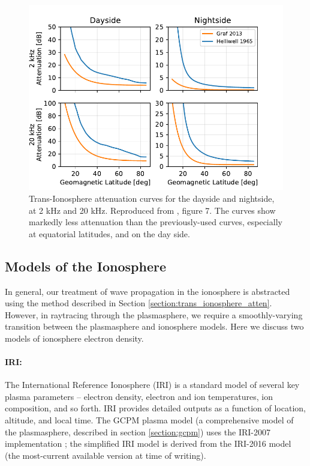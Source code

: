 
\begin{figure}[h]
\begin{center}
\includegraphics{figures/iono_absorp_curves}
\caption[Trans-Ionosphere attenuation curves for day and night]{Trans-Ionosphere attenuation curves for the dayside and nightside, at 2 kHz and 20 kHz. Reproduced from \cite{Graf2013}, figure 7. The \citeauthor{Graf2013} curves show markedly less attenuation than the previously-used \citeauthor{Helliwell1965} curves, especially at equatorial latitudes, and on the day side.}
\label{fig:graf_curves}
\end{center}
\end{figure}


\subsection{Models of the Ionosphere}
In general, our treatment of wave propagation in the ionosphere is abstracted using the method described in Section \ref{section:trans_ionosphere_atten}. However, in raytracing through the plasmasphere, we require a smoothly-varying transition between the plasmasphere and ionosphere models. Here we discuss two models of ionosphere electron density.

\paragraph{IRI:}
The International Reference Ionosphere (IRI) is a standard model of several key plasma parameters -- electron density, electron and ion temperatures, ion composition, and so forth. IRI provides detailed outputs as a function of location, altitude, and local time. The GCPM plasma model (a comprehensive model of the plasmasphere, described in section \ref{section:gcpm}) uses the IRI-2007 implementation \citep{Bilitza2008}; the simplified IRI model is derived from the IRI-2016 model (the most-current available version at time of writing).

